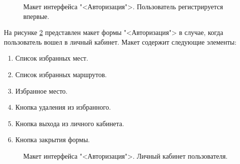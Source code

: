 \vspace{+40mm}
\begin{figure}[ht]
	\center{\texttt{[image: gr8]}}
	\caption{Макет интерфейса "<Авторизация">. Пользователь регистрируется впервые.}
	\label{gr8:image}
\end{figure}

На рисунке \ref{gr9:image} представлен макет формы "<Авторизация"> в случае, когда пользователь вошел в личный кабинет. Макет содержит следующие элементы:

\begin{enumerate}
	\item Список избранных мест.
	\item Список избранных маршрутов.
	\item Избранное место.
	\item Кнопка удаления из избранного.
	\item Кнопка выхода из личного кабинета.
	\item Кнопка закрытия формы.
\end{enumerate}

\begin{figure}[ht]
	\center{\texttt{[image: gr9]}}
	\caption{Макет интерфейса "<Авторизация">. Личный кабинет пользователя.}
	\label{gr9:image}
\end{figure}